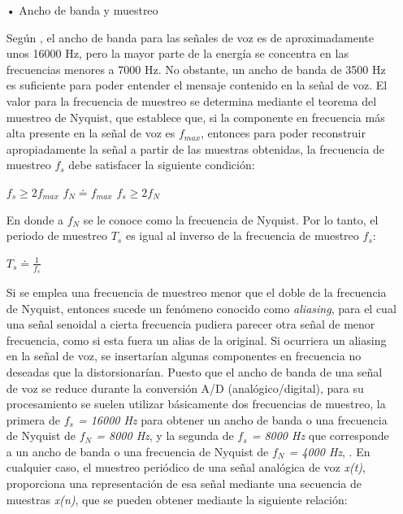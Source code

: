 \begin{enumerate}
\begin{enumerate}
\item[•]Ancho de banda y muestreo
\par
Según \cite{claudio}, el ancho de banda para las señales de voz es de aproximadamente unos 16000 Hz, pero la mayor parte de la energía se concentra en las frecuencias menores a 7000 Hz. No obstante, un ancho de banda de 3500 Hz es suficiente para poder entender el mensaje contenido en la señal de voz.
\vskip 0.5cm
El valor para la frecuencia de muestreo se determina mediante el teorema del muestreo de Nyquist, que establece que, si la componente en frecuencia más alta presente en la señal de voz es \textit{$f_{max}$}, entonces para poder reconstruir apropiadamente la señal a partir de las muestras obtenidas, la frecuencia de muestreo \textit{$f_{s}$} debe satisfacer la siguiente condición:
\begin{center}
$f_{s} \geq 2f_{max}$ \hspace{1cm} $f_{N} \doteq f_{max}$ \hspace{1cm} $f_{s} \geq 2f_{N}$
\end{center}
En donde a $f_{N}$ se le conoce como la frecuencia de Nyquist. Por lo tanto, el periodo de muestreo $T_{s}$ es igual al inverso de la frecuencia de muestreo \textit{$f_{s}$}:
\begin{center}
$T_{s} \doteq \frac{1}{f_{s}}$
\end{center}
Si se emplea una frecuencia de muestreo menor que el doble de la frecuencia de Nyquist, entonces sucede un fenómeno conocido como \textit{aliasing}, para el cual una señal senoidal a cierta frecuencia pudiera parecer otra señal de menor frecuencia, como si esta fuera un alias de la original. Si ocurriera un aliasing en la señal de voz, se insertarían algunas componentes en frecuencia no deseadas que la distorsionarían.
\newpage
Puesto que el ancho de banda de una señal de voz se reduce durante la conversión A/D (analógico/digital), para su procesamiento se suelen utilizar básicamente dos frecuencias de muestreo, la primera de \textit{$f_{s}$ = 16000 Hz} para obtener un ancho de banda o una frecuencia de Nyquist de \textit{$f_{N}$ = 8000 Hz}, y la segunda de \textit{$f_{s}$ = 8000 Hz} que corresponde a un ancho de banda o una frecuencia de Nyquist de \textit{$f_{N}$ = 4000 Hz}, \cite{claudio}.
\vskip 0.5cm
En cualquier caso, el muestreo periódico de una señal analógica de voz \textit{x(t)}, proporciona una representación de esa señal mediante una secuencia de muestras \textit{x(n)}, que se pueden obtener mediante la siguiente relación:
\begin{center}

\end{center}
\end{enumerate}
\end{enumerate}

